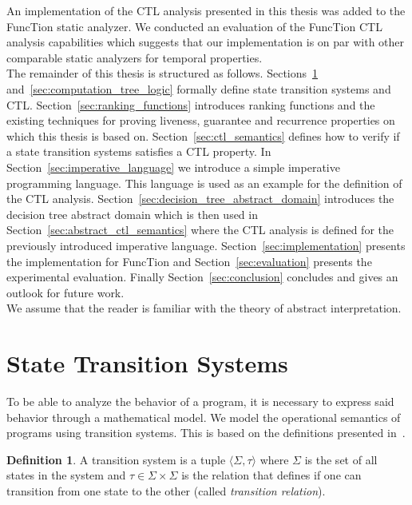 \documentclass[11pt,a4paper,titlepage]{article}
\theoremstyle{definition}
\newtheorem{definition}{Definition}[section]
\begin{document}
An implementation of the CTL analysis presented in this thesis was added to the FuncTion static analyzer. 
We conducted an evaluation of the FuncTion CTL analysis capabilities which suggests that our implementation is on par with other comparable static analyzers
for temporal properties.\\

The remainder of this thesis is structured as follows. 
Sections~\ref{sec:state_transition_system} and~\ref{sec:computation_tree_logic} formally define state transition systems and CTL.
Section~\ref{sec:ranking_functions} introduces ranking functions and the existing techniques for proving liveness, 
guarantee and recurrence properties on which this thesis is based on.
Section~\ref{sec:ctl_semantics} defines how to verify if a state transition systems satisfies a CTL property.
In Section~\ref{sec:imperative_language} we introduce a simple imperative programming language. 
This language is used as an example for the definition of the CTL analysis. 
Section~\ref{sec:decision_tree_abstract_domain} introduces the decision tree abstract domain which is then used 
in Section~\ref{sec:abstract_ctl_semantics} where the CTL analysis is defined for the previously introduced imperative language. 
Section~\ref{sec:implementation} presents the implementation for 
FuncTion and Section~\ref{sec:evaluation} presents the experimental evaluation. 
Finally Section~\ref{sec:conclusion} concludes and gives an outlook for future work.\\

We assume that the reader is familiar with the theory of abstract interpretation. 

\section{State Transition Systems}\label{sec:state_transition_system}

To be able to analyze the behavior of a program, it is necessary 
to express said behavior through a mathematical model. 
We model the operational semantics of programs using transition systems. 
This is based on the definitions presented in~\cite{UrbanM-VMCAI15}.

\begin{definition}
    A transition system is a tuple $\langle \Sigma, \tau \rangle$ where $\Sigma$ 
    is the set of all states in the system and $\tau \in \Sigma \times \Sigma$ 
    is the relation that defines if one can transition from one state to the other (called \emph{transition relation}).
\end{definition}
\end{document}
